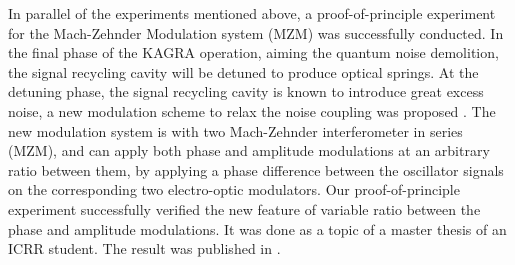 In parallel of the experiments mentioned above, a proof-of-principle experiment
for the Mach-Zehnder Modulation system (MZM) was successfully conducted.
In the final phase of the KAGRA operation, aiming the quantum noise demolition, 
the signal recycling cavity will be detuned to produce optical springs.
At the detuning phase, the signal recycling cavity is known to introduce great excess noise,
a new modulation scheme to relax the noise coupling was proposed \cite{ioo:dt}.
The new modulation system is with two Mach-Zehnder interferometer in series (MZM),
and can apply both phase and amplitude modulations at an arbitrary ratio between them,
by applying a phase difference between the oscillator signals on the corresponding two electro-optic modulators.
Our proof-of-principle experiment successfully verified the new feature
of variable ratio between the phase and amplitude modulations.
It was done as a topic of a master thesis of an ICRR student.
The result was published in \cite{ioo:mzm}.



